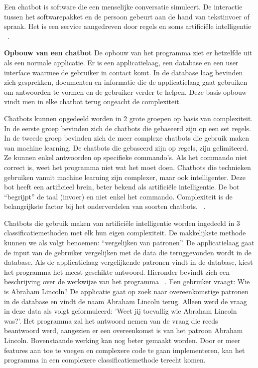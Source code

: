 Een chatbot is software die een menselijke conversatie simuleert. De interactie tussen het softwarepakket en de persoon gebeurt aan de hand van tekstinvoer of spraak. Het is een service aangedreven door regels en soms artificiële intelligentie ~\autocite{Schlicht2016}.

\textbf{Opbouw van een chatbot}\newline
De opbouw van het programma ziet er hetzelfde uit als een normale applicatie. Er is een applicatielaag, een database en een user interface waarmee de gebruiker in contact komt.  In de database laag bevinden zich gesprekken, documenten en informatie die de applicatielaag gaat gebruiken om antwoorden te vormen en de gebruiker verder te helpen. Deze basis opbouw vindt men in elke chatbot terug ongeacht de complexiteit. ~\autocite{Techlabs2017} \newline

Chatbots kunnen opgedeeld worden in 2 grote groepen op basis van complexiteit. In de eerste groep bevinden zich de chatbots die gebaseerd zijn op een set regels. In de tweede groep bevinden zich de meer complexe chatbots die gebruik maken van machine learning. De chatbots die gebaseerd zijn op regels, zijn gelimiteerd. Ze kunnen enkel antwoorden op specifieke commando’s. Als het commando niet correct is, weet het programma niet wat het moet doen. Chatbots die technieken gebruiken vanuit machine learning zijn complexer, maar ook intelligenter. Deze bot heeft een artificieel brein, beter bekend als artificiële intelligentie. De bot “begrijpt” de taal (invoer) en niet enkel het commando. Complexiteit is de belangrijkste factor bij het onderverdelen van soorten chatbots. ~\autocite{Schlicht2016}. \newline

Chatbots die gebruik maken van artificiële intelligentie worden ingedeeld in 3 classificatiemethoden met elk hun eigen complexiteit. De makkelijkste methode kunnen we als volgt benoemen: “vergelijken van patronen”. De applicatielaag gaat de input van de gebruiker vergelijken met de data die teruggevonden wordt in de database. Als de applicatielaag vergelijkende patronen vindt in de database, kiest het programma het meest geschikte antwoord. Hieronder bevindt  zich een beschrijving over de werkwijze van het programma ~\autocite{Techlabs2017}. \newline
Een gebruiker vraagt: Wie is Abraham Lincoln? De applicatie gaat op zoek naar overeenkomstige patronen in de database en vindt de naam Abraham Lincoln terug. Alleen werd de vraag in deze data als volgt geformuleerd: 'Weet jij toevallig wie Abraham Lincoln was?'. Het programma zal het antwoord nemen van de vraag die reeds beantwoord werd, aangezien er een overeenkomst is van het patroon Abraham Lincoln. 
Bovenstaande werking kan nog beter gemaakt worden. Door er meer features aan toe te voegen en complexere code te gaan implementeren, kan het programma in een complexere classificatiemethode terecht komen. \newline

